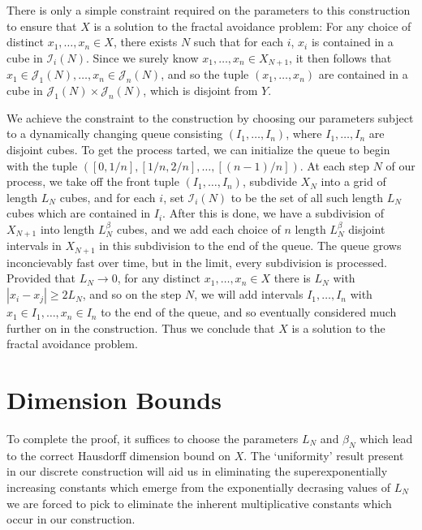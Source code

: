 \documentclass{article}
\theoremstyle{plain}
\theoremstyle{plain}
\begin{document}
\begin{multicols}{2}
There is only a simple constraint required on the parameters to this construction to ensure that $X$ is a solution to the fractal avoidance problem: For any choice of distinct $x_1, \dots, x_n \in X$, there exists $N$ such that for each $i$, $x_i$ is contained in a cube in $\mathcal{I}_i(N)$. Since we surely know $x_1, \dots, x_n \in X_{N+1}$, it then follows that $x_1 \in \mathcal{J}_1(N), \dots, x_n \in \mathcal{J}_n(N)$, and so the tuple $(x_1, \dots, x_n)$ are contained in a cube in $\mathcal{J}_1(N) \times \mathcal{J}_n(N)$, which is disjoint from $Y$.


We achieve  the constraint to the construction by choosing our parameters subject to a dynamically changing queue consisting $(I_1, \dots, I_n)$, where $I_1 ,\dots, I_n$ are disjoint cubes. To get the process tarted, we can initialize the queue to begin with the tuple $([0,1/n], [1/n,2/n], \dots, [(n-1)/n])$. At each step $N$ of our process, we take off the front tuple $(I_1, \dots, I_n)$, subdivide $X_N$ into a grid of length $L_N$ cubes, and for each $i$, set $\mathcal{I}_i(N)$ to be the set of all such length $L_N$ cubes which are contained in $I_i$. After this is done, we have a subdivision of $X_{N+1}$ into length $L_N^\beta$ cubes, and we add each choice of $n$ length $L_N^\beta$ disjoint intervals in $X_{N+1}$ in this subdivision to the end of the queue. The queue grows inconcievably fast over time, but in the limit, every subdivision is processed. Provided that $L_N \to 0$, for any distinct $x_1, \dots, x_n \in X$ there is $L_N$ with $|x_i - x_j| \geq 2 L_N$, and so on the step $N$, we will add intervals $I_1, \dots, I_n$ with $x_1 \in I_1, \dots, x_n \in I_n$ to the end of the queue, and so eventually considered much further on in the construction. Thus we conclude that $X$ is a solution to the fractal avoidance problem.

\section{Dimension Bounds}

To complete the proof, it suffices to choose the parameters $L_N$ and $\beta_N$ which lead to the correct Hausdorff dimension bound on $X$. The `uniformity' result present in our discrete construction will aid us in eliminating the superexponentially increasing constants which emerge from the exponentially decrasing values of $L_N$ we are forced to pick to eliminate the inherent multiplicative constants which occur in our construction.


\end{multicols}
\end{document}
